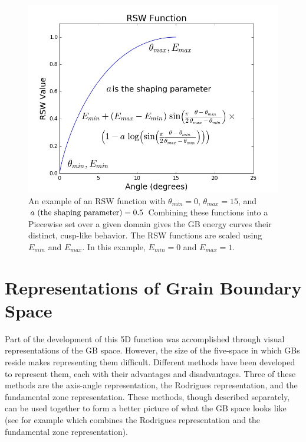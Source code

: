 \documentclass[12pt]{report}
\begin{document}
\begin{figure}[ht!]
\end{figure}

\begin{figure}[ht!]
 \centering
 \includegraphics[scale=0.5]{Images/rsw}
 \caption{\label{fig:RSW}An example of an RSW function with $\theta_{min} = 0$\textdegree{}, $\theta_{max} = 15$\textdegree{}, and $a\ \textnormal{(the shaping parameter)} = 0.5$  Combining these functions into a Piecewise set over a given domain gives the GB energy curves their distinct, cusp-like behavior.  The RSW functions are scaled using $E_{min}$ and $E_{max}$.  In this example, $E_{min} = 0$ and $E_{max} = 1$.}
\end{figure}

\section{Representations of Grain Boundary Space}
Part of the development of this 5D function was accomplished through visual representations of the GB space.  However, the size of the five-space in which GBs reside makes representing them difficult.  Different methods have been developed to represent them, each with their advantages and disadvantages.  Three of these methods are the axis-angle representation, the Rodrigues representation, and the fundamental zone representation.  These methods, though described separately, can be used together to form a better picture of what the GB space looks like (see for example  which combines the Rodrigues representation and the fundamental zone representation).
\end{document}
